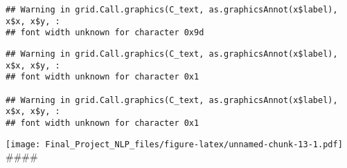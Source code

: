 \documentclass[
]{article}
\begin{document}
\begin{verbatim}
## Warning in grid.Call.graphics(C_text, as.graphicsAnnot(x$label), x$x, x$y, :
## font width unknown for character 0x9d
\end{verbatim}

\begin{verbatim}
## Warning in grid.Call.graphics(C_text, as.graphicsAnnot(x$label), x$x, x$y, :
## font width unknown for character 0x1

## Warning in grid.Call.graphics(C_text, as.graphicsAnnot(x$label), x$x, x$y, :
## font width unknown for character 0x1
\end{verbatim}

\texttt{[image: Final\_Project\_NLP\_files/figure-latex/unnamed-chunk-13-1.pdf]}
\#\#\#\#
\end{document}
